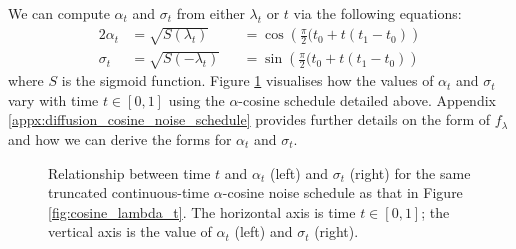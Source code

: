 \documentclass[ oneside,%
                    author={George Herbert},
                    degree={MSci},
                     title={Video Diffusion Models for Climate Simulations},
                  subtitle={}]{dissertation}
\begin{document}
We can compute $\alpha_t$ and $\sigma_t$ from either $\lambda_t$ or $t$ via the following equations:
\begin{alignat}{2}
      \alpha_t&=\sqrt{S(\lambda_t)}&&=\cos\left(\frac{\pi}{2}(t_0+t(t_1-t_0)\right)\label{eq:alpha_t_alpha_cosine}\\
      \sigma_t&=\sqrt{S(-\lambda_t)}&&=\sin\left(\frac{\pi}{2}(t_0+t(t_1-t_0)\right)\label{eq:sigma_t_alpha_cosine}
\end{alignat}
where $S$ is the sigmoid function. Figure \ref{fig:cosine_alpha_sigma} visualises how the values of $\alpha_t$ and $\sigma_t$ vary with time $t\in[0,1]$ using the $\alpha$-cosine schedule detailed above. Appendix \ref{appx:diffusion_cosine_noise_schedule} provides further details on the form of $f_\lambda$ and how we can derive the forms for $\alpha_t$ and $\sigma_t$.

\begin{figure}[htbp]
      \begin{subfigure}{0.5\textwidth}
      \end{subfigure}
      \begin{subfigure}{0.5\textwidth}
      \end{subfigure}
      \caption{Relationship between time $t$ and $\alpha_t$ (left) and $\sigma_t$ (right) for the same truncated continuous-time $\alpha$-cosine noise schedule as that in Figure \ref{fig:cosine_lambda_t}. The horizontal axis is time $t\in[0,1]$; the vertical axis is the value of $\alpha_t$ (left) and $\sigma_t$ (right).}
      \label{fig:cosine_alpha_sigma}
\end{figure}
\end{document}
